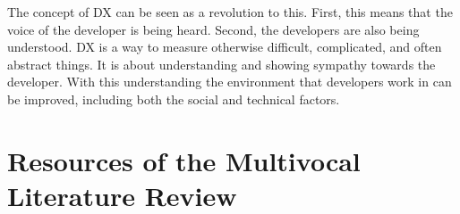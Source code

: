 \documentclass[english, 12pt, a4paper, sci, utf8, a-1b, online]{aaltothesis}
\begin{document}
The concept of DX can be seen as a revolution to this. First, this means that the voice of the developer is being heard. Second, the developers are also being understood. DX is a way to measure otherwise difficult, complicated, and often abstract things. It is about understanding and showing sympathy towards the developer. With this understanding the environment that developers work in can be improved, including both the social and technical factors.

\clearpage
\thesisbibliography
\printbibliography

\clearpage
\thesisappendix

\section{Resources of the Multivocal Literature Review}

\renewcommand{\arraystretch}{1.5}
\end{document}
